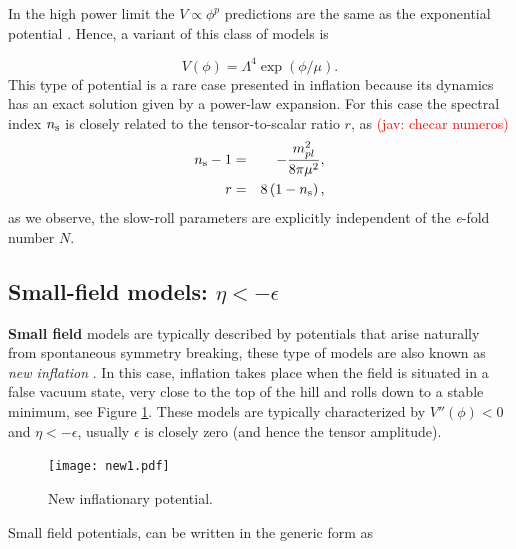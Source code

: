 \documentclass{rmaa}
\newcommand{\jav}[1]{\textcolor{red}{(jav: #1)}}
\begin{document}
\noindent
In the high power limit the $V \propto \phi^p$ predictions are the same as the exponential 
potential \citep{La}. Hence, a variant of this class of models is 

\begin{equation}
V\left(\phi\right) = \Lambda^4 \exp\left(\phi / \mu\right).
\end{equation}
%
 This type of potential is a rare case presented in inflation because its 
 dynamics has an exact solution given by a power-law expansion.
 For this case the spectral index $n_{\rm s}$ is closely related to the tensor-to-scalar ratio $r$, as 
\jav{checar numeros}
\begin{eqnarray}
n_{\rm s}-1&=&-\frac{m^2_{pl}}{8\pi \mu^2}, \nonumber \\
r &=& 8 \left(1 - n_{\rm s}\right),
\end{eqnarray}
%
as we observe, the slow-roll parameters are explicitly independent of the \textit{e}-fold number $N$. 

\subsection{Small-field models: $\eta < -\epsilon$}


\textbf{Small field} models are typically described by potentials that arise 
naturally from spontaneous symmetry breaking, these type of models are also
known as \textit{new inflation} \citep{Steinhardt, Linde2}. 
In this case, inflation takes place when the field is situated in a false vacuum state,
very close to the top of the hill and rolls down to a stable minimum, see Figure \ref{fig:new2}. 
These models are typically characterized by $V''\left(\phi\right) < 0$
and $\eta < -\epsilon$, usually $\epsilon$ 
is closely zero (and hence the tensor amplitude). 

 \begin{figure}
 \begin{center}
  \texttt{[image: new1.pdf]}
	\caption{New inflationary potential.}
	\label{fig:new2}
 \end{center}	
\end{figure}

\noindent
Small field potentials, can be written in the generic form as
\end{document}
